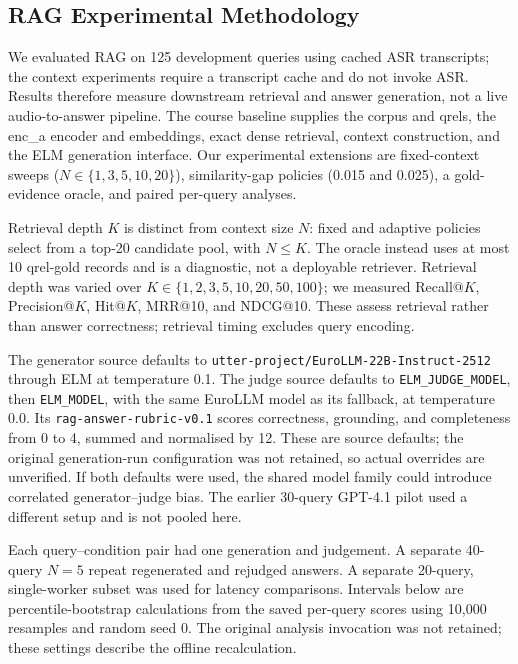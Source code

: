 \subsection{RAG Experimental Methodology}
\label{sec:rag_methodology}

We evaluated RAG on 125 development queries
using cached ASR transcripts; the context
experiments require a transcript cache and do
not invoke ASR. Results therefore measure
downstream retrieval and answer generation,
not a live audio-to-answer pipeline. The
course baseline supplies the corpus and qrels,
the enc\_a encoder and embeddings, exact dense
retrieval, context construction, and the ELM
generation interface. Our experimental
extensions are fixed-context sweeps
($N\in\{1,3,5,10,20\}$), similarity-gap
policies (0.015 and 0.025), a gold-evidence
oracle, and paired per-query analyses.

Retrieval depth $K$ is distinct from context
size $N$: fixed and adaptive policies select
from a top-20 candidate pool, with $N\leq K$.
The oracle instead uses at most 10 qrel-gold
records and is a diagnostic, not a deployable
retriever. Retrieval depth was varied over
$K\in\{1,2,3,5,10,20,50,100\}$; we measured
Recall@$K$, Precision@$K$, Hit@$K$, MRR@10,
and NDCG@10. These assess retrieval rather
than answer correctness; retrieval timing
excludes query encoding.

The generator source defaults to
\texttt{utter-project/EuroLLM-22B-Instruct-2512}
through ELM at temperature 0.1. The judge
source defaults to \texttt{ELM\_JUDGE\_MODEL},
then \texttt{ELM\_MODEL}, with the same
EuroLLM model as its fallback, at temperature
0.0. Its \texttt{rag-answer-rubric-v0.1}
scores correctness, grounding, and completeness
from 0 to 4, summed and normalised by 12.
These are source defaults; the original
generation-run configuration was not retained,
so actual overrides are unverified. If both
defaults were used, the shared model family
could introduce correlated generator--judge
bias. The earlier 30-query GPT-4.1 pilot used
a different setup and is not pooled here.

Each query--condition pair had one generation
and judgement. A separate 40-query $N=5$
repeat regenerated and rejudged answers. A
separate 20-query, single-worker subset was
used for latency comparisons. Intervals below
are percentile-bootstrap calculations from the
saved per-query scores using 10,000 resamples
and random seed 0. The original analysis
invocation was not retained; these settings
describe the offline recalculation.